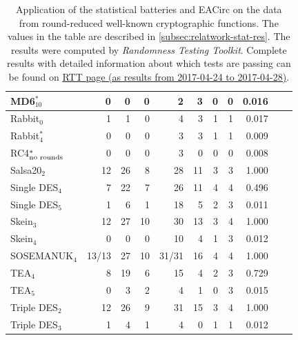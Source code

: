 \documentclass[
    digital,    %
    oneside,    %
    color,
    11pt,
    nocover,
    notable,
    nolof,
    nolot,
]{fithesis3}
\newcommand{\fd}{\cellcolor{red!25}}
\newcommand{\fn}{}
\begin{document}
\begin{table}[H]
\begin{tabular}{@{}l|rrrrrrrrrr@{}}
MD6$_{10}^{\ast}$                &  0    \fn &  0 \fn &  0 \fn   &  2    \fn &  3 \fd & 0 \fn & 0 \fn & 0.016 \fn \\ \hline
Rabbit$_{0}$                     &  1    \fn &  1 \fn &  0 \fn   &  4    \fd &  3 \fd & 1 \fn & 1 \fn & 0.017 \fn \\
Rabbit$_{4}^{\ast}$              &  0    \fn &  0 \fn &  0 \fn   &  3    \fn &  3 \fd & 1 \fn & 1 \fn & 0.009 \fn \\ \hline
RC4$_{\textnormal{no rounds}}^{\ast}$ &  0 \fn &  0 \fn &  0 \fn &  3    \fn &  0 \fn & 0 \fn & 0 \fn & 0.008 \fn \\ \hline
Salsa20$_{2}$                    & 12    \fd & 26 \fd &  8 \fd   & 28    \fd & 11 \fd & 3 \fd & 3 \fd & 1.000 \fd \\ \hline
Single DES$_{4}$                 &  7    \fd & 22 \fd &  7 \fd   & 26    \fd & 11 \fd & 4 \fd & 4 \fd & 0.496 \fd \\
Single DES$_{5}$                 &  1    \fn &  6 \fd &  1 \fn   & 18    \fd &  5 \fd & 2 \fd & 3 \fd & 0.011 \fn \\ \hline
Skein$_{3}$                      & 12    \fd & 27 \fd & 10 \fd   & 30    \fd & 13 \fd & 3 \fd & 4 \fd & 1.000 \fd \\
Skein$_{4}$                      &  0    \fn &  0 \fn &  0 \fn   & 10    \fd &  4 \fd & 1 \fn & 3 \fd & 0.012 \fn \\ \hline
SOSEMANUK$_{4}$                  & 13/13 \fd & 27 \fd & 10 \fd   & 31/31 \fd & 16 \fd & 4 \fd & 4 \fd & 1.000 \fd \\ \hline
TEA$_{4}$                        &  8    \fd & 19 \fd &  6 \fd   & 15    \fd &  4 \fd & 2 \fd & 3 \fd & 0.729 \fd \\
TEA$_{5}$                        &  0    \fn &  3 \fn &  2 \fn   &  4    \fd &  1 \fn & 0 \fn & 3 \fd & 0.015 \fn \\ \hline
Triple DES$_{2}$                 & 12    \fd & 26 \fd &  9 \fd   & 31    \fd & 15 \fd & 3 \fd & 4 \fd & 1.000 \fd \\
Triple DES$_{3}$                 &  1    \fn &  4 \fd &  1 \fn   &  4    \fd &  0 \fn & 1 \fn & 1 \fn & 0.012 \fn \\

\end{tabular}

\caption{Application of the statistical batteries and EACirc on the data from round-reduced well-known cryptographic functions. 
The values in the table are described in \cref{subsec:relatwork-stat-res}.
The results were computed by \textit{Randomness Testing Toolkit}. Complete results with detailed information about which tests are passing can be found on \href{http://rtt.ics.muni.cz/ViewResults/?created_from=2017-04-24+12\%3A00\%3A00&created_to=2017-04-29+00\%3A00\%3A00}{RTT page (as results from 2017-04-24 to 2017-04-28)}.}
\label{table:res-batteries}
\end{table}
\end{document}
